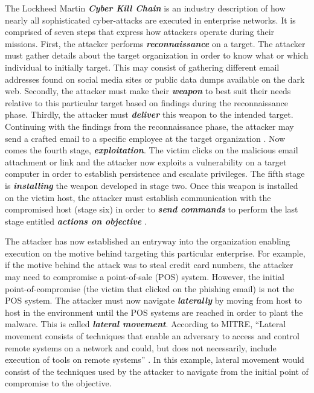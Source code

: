 \documentclass[sigconf]{acmart}
\begin{document}
The Lockheed Martin \textit{\textbf{Cyber Kill Chain}} is an industry description of how nearly all sophisticated cyber-attacks are executed in enterprise networks. It is comprised of seven steps that
express how attackers operate during their missions. First, the attacker performs \textit{\textbf{reconnaissance}} on a target. The attacker must gather details about the target organization in order to
know what or which individual to initially target. This may consist of gathering different email addresses found on social media sites or public data dumps available on the dark web. Secondly, the attacker
must make their \textit{\textbf{weapon}} to best suit their needs relative to this particular target based on findings during the reconnaissance phase. Thirdly, the attacker must \textit{\textbf{deliver}}
this weapon to the intended target. Continuing with the findings from the reconnaissance phase, the attacker may send a crafted email to a specific employee at the target organization \cite{SORIA}. Now comes
the fourth stage, \textit{\textbf{exploitation}}. The victim clicks on the malicious email attachment or link and the attacker now exploits a vulnerability on a target computer in order to establish
persistence and escalate privileges. The fifth stage is \textit{\textbf{installing}} the weapon developed in stage two. Once this weapon is installed on the victim host, the attacker must establish
communication with the compromised host (stage six) in order to \textit{\textbf{send commands}} to perform the last stage entitled \textit{\textbf{actions on objective}} \cite{L.M.}.

The attacker has now
established an entryway into the organization enabling execution on the motive
behind targeting this particular enterprise. For example, if the motive behind the attack was to steal credit card numbers, the attacker may need to compromise a point-of-sale (POS) system. However, the
initial point-of-compromise (the victim that clicked on the phishing email) is not the POS system. The attacker must now navigate \textit{\textbf{laterally}} by moving from host to host in the environment until the
POS systems are reached in order to plant the malware. This is called \textit{\textbf{lateral movement}}. According to MITRE, ``Lateral movement consists of techniques that enable an adversary to access and control
remote systems on a network and could, but does not necessarily, include execution of tools on remote systems'' \cite{M}. In this example, lateral movement would consist of the techniques used by the
attacker to navigate from the initial point of compromise to the objective.
\end{document}

